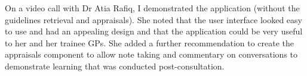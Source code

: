 On a video call with Dr Atia Rafiq, I demonstrated the application (without the guidelines retrieval and appraisals). She noted that the user interface looked easy to use and had an appealing design and that the application could be very useful to her and her trainee GPs. She added a further recommendation to create the appraisals component to allow note taking and commentary on conversations to demonstrate learning that was conducted post-consultation.




